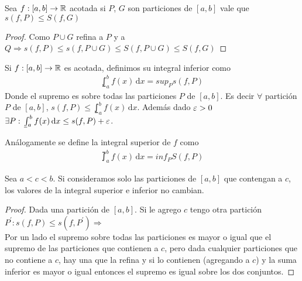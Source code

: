 \begin{corollary}
  Sea $f: [a, b] \to \mathbb{R}$ acotada si $P$, $G$ son particiones de $[a, b]$ vale que $s(f, P) \leq S(f, G)$
  \begin{proof}
    Como $P \cup G$ refina a $P$ y a $Q \Rightarrow s(f, P) \leq s(f, P \cup G) \leq S(f, P \cup G) \leq S(f, G)$
  \end{proof}
\end{corollary}

\begin{definition}
  Si $f: [a, b] \to \mathbb{R}$ es acotada, definimos su integral inferior como \begin{align*}
    \lowint_a^b f(x)\,\mathrm{d}x = sup_P s(f, P)
  \end{align*}
  Donde el supremo es sobre todas las particiones $P$ de $[a, b]$. Es decir $\forall$ partición $P$ de $[a, b]$, $s(f, P) \leq \lowint_a^b f(x)\, \mathrm{d}x$.
  Además dado $\varepsilon > 0$ $\exists P : \lowint_a^b f(x)\, \mathrm{d}x \leq s(f, P) + \e$.
\end{definition}

\begin{definition}
  Análogamente se define la integral superior de $f$ como \begin{align*}
    \upint_a^b f(x)\, \mathrm{d}x = inf_P S(f, P)
  \end{align*}
\end{definition}

\begin{lemma}
  Sea $a < c < b$. Si consideramos solo las particiones de $[a, b]$ que contengan a $c$, los valores de la integral superior e inferior no cambian.
  \begin{proof}
    Dada una partición de $[a, b]$. Si le agrego $c$ tengo otra partición $P^{\prime} : s(f, P) \leq s(f, P^{\prime}) \Rightarrow$ \\
    Por un lado el supremo sobre todas las particiones es mayor o igual que el supremo de las particiones que contienen a $c$, pero dada cualquier particiones que no contiene a $c$,
    hay una que la refina y si lo contienen (agregando a $c$) y la suma inferior es mayor o igual entonces el supremo es igual sobre los dos conjuntos.
  \end{proof}
\end{lemma}

\clearpage

